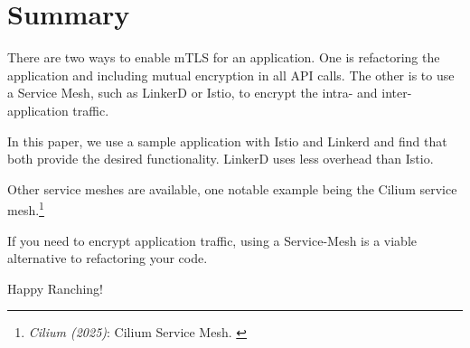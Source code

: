 %
%

\pagebreak
\section{Summary}

\onehalfspacing

There are two ways to enable mTLS for an application. One is refactoring the application and including mutual encryption in all API calls. The other is to use a Service Mesh, such as LinkerD or Istio, to encrypt the intra- and inter-application traffic.

In this paper, we use a sample application with Istio and Linkerd and find that both provide the desired functionality. LinkerD uses less overhead than Istio.

Other service meshes are available, one notable example being the Cilium service mesh.\footnote{\textit{Cilium (2025)}: Cilium Service Mesh. \cite{ciliumMesh}}

If you need to encrypt application traffic, using a Service-Mesh is a viable alternative to refactoring your code.

Happy Ranching!
